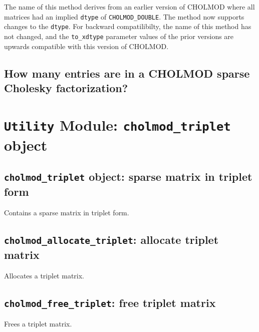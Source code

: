 \documentclass[11pt]{article}
\begin{document}
The name of this method derives from an earlier version of CHOLMOD where all
matrices had an implied \verb'dtype' of \verb'CHOLMOD_DOUBLE'.  The method now
supports changes to the \verb'dtype'.  For backward compatilibilty, the name of
this method has not changed, and the \verb'to_xdtype' parameter values of the
prior versions are upwards compatible with this version of CHOLMOD.

\subsection{How many entries are in a CHOLMOD sparse Cholesky factorization?}

\newpage \section{{\tt Utility} Module: {\tt cholmod\_triplet} object}
\label{cholmod_triplet}

\subsection{{\tt cholmod\_triplet} object: sparse matrix in triplet form}


Contains a sparse matrix in triplet form.

\subsection{{\tt cholmod\_allocate\_triplet}: allocate triplet matrix}


Allocates a triplet matrix.

\subsection{{\tt cholmod\_free\_triplet}: free triplet matrix}


Frees a triplet matrix.

\end{document}
